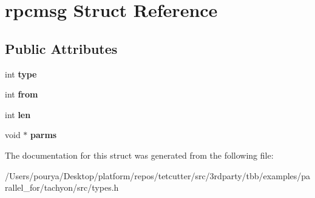 \hypertarget{structrpcmsg}{}\section{rpcmsg Struct Reference}
\label{structrpcmsg}
\subsection*{Public Attributes}
\begin{DoxyCompactItemize}
\item 
\hypertarget{structrpcmsg_ae72ce9c17e09627b889f743efded9588}{}int {\bfseries type}\label{structrpcmsg_ae72ce9c17e09627b889f743efded9588}

\item 
\hypertarget{structrpcmsg_ab493b4e3621fe11b809b0eb10ae75c46}{}int {\bfseries from}\label{structrpcmsg_ab493b4e3621fe11b809b0eb10ae75c46}

\item 
\hypertarget{structrpcmsg_a3922c1b7bee0931df457878d651537aa}{}int {\bfseries len}\label{structrpcmsg_a3922c1b7bee0931df457878d651537aa}

\item 
\hypertarget{structrpcmsg_a661cc7a266a95bfa1b20a09fcdc9d3d5}{}void $\ast$ {\bfseries parms}\label{structrpcmsg_a661cc7a266a95bfa1b20a09fcdc9d3d5}

\end{DoxyCompactItemize}


The documentation for this struct was generated from the following file\+:\begin{DoxyCompactItemize}
\item 
/\+Users/pourya/\+Desktop/platform/repos/tetcutter/src/3rdparty/tbb/examples/parallel\+\_\+for/tachyon/src/types.\+h\end{DoxyCompactItemize}
